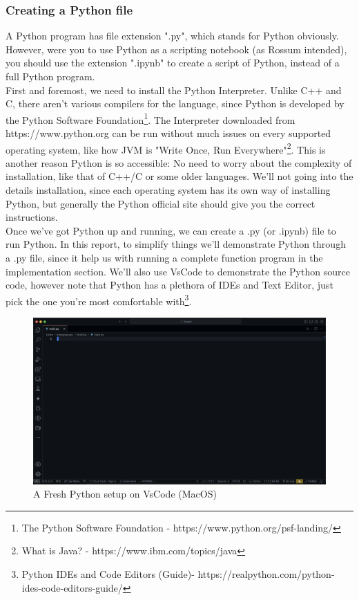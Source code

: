 \documentclass[twoside,final]{hcmut-report}
\begin{document}
\subsubsection{Creating a Python file}
\hspace*{1mm} A Python program has file extension ".py", which stands for Python obviously. However, were you to use Python as a scripting notebook (as Rossum intended), you should use the extension ".ipynb" to create a script of Python, instead of a full Python program.\\
\hspace*{6.5mm} First and foremost, we need to install the Python Interpreter. Unlike C++ and C, there aren't various compilers for the language, since Python is developed by the Python Software Foundation\footnote{The Python Software Foundation - https://www.python.org/psf-landing/}. The Interpreter downloaded from https://www.python.org can be run without much issues on every supported operating system, like how JVM is "Write Once, Run Everywhere"\footnote{What is Java? - https://www.ibm.com/topics/java}. This is another reason Python is so accessible: No need to worry about the complexity of installation, like that of C++/C or some older languages. We'll not going into the details installation, since each operating system has its own way of installing Python, but generally the Python official site should give you the correct instructions.\\
\hspace*{6.5mm} Once we've got Python up and running, we can create a .py (or .ipynb) file to run Python. In this report, to simplify things we'll demonstrate Python through a .py file, since it help us with running a complete function program in the implementation section. We'll also use VsCode to demonstrate the Python source code, however note that Python has a plethora of IDEs and Text Editor, just pick the one you're most comfortable with\footnote{Python IDEs and Code Editors (Guide)- https://realpython.com/python-ides-code-editors-guide/}.
\begin{figure}[ht]
\centering
\includegraphics[width=\textwidth]{graphics/python1}
\caption{A Fresh Python setup on VsCode (MacOS)}
\end{figure}
\pagebreak
\end{document}
